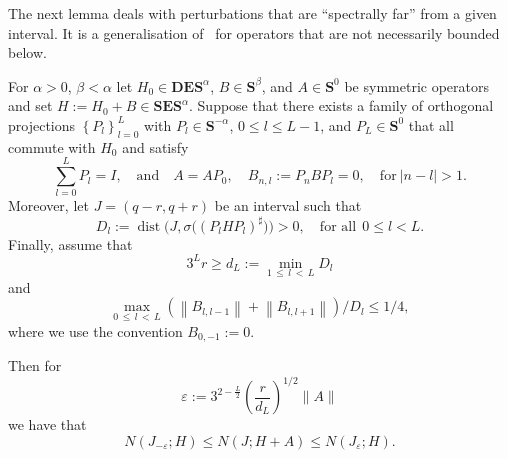 \documentclass[AHL,Unicode,longabstracts,published]{cedram}
\newcommand{\BD}{\mathbf D}
\newcommand{\BE}{\mathbf E}
\newcommand{\BS}{\mathbf S}
\newcommand{\eps}{\varepsilon}
\newcommand{\abs}[1]{\left\lvert #1 \right\rvert}
\newcommand{\set}[1]{\left\{ #1 \right\}}
\newcommand{\norm}[1]{\left\| #1 \right\|}
\begin{document}
The next lemma deals with perturbations that are ``spectrally far'' from a given interval. It is a generalisation of~\cite[Lemma~11.1]{MorParSht2014} for operators that are not necessarily bounded below.


\begin{lemm} \label{lem:spectralperturb}
For $\alpha>0$, $\beta < \alpha$ let $H_0 \in \BD\BE\BS^\alpha$, $B \in \BS^\beta$, and $A\in\BS^0$ be symmetric operators and set $H:=H_0+B\in\BS\BE\BS^\alpha$. Suppose that there exists a family of orthogonal projections $\set{P_l}_{l=0}^L$ with $P_l\in \BS^{-\alpha}$, $0\leq l\leq L-1$, and $P_L\in \BS^0$ that all commute with $H_0$ and satisfy
\begin{equation}\label{eq:projections}
\sum_{l=0}^L P_l = I, \quad \text{and} \quad A = A P_0, \quad B_{n,l} := P_n B P_l = 0, \quad \text{for} \ \abs{n-l}>1.
\end{equation}
Moreover, let $J = (q-r,q+r)$ be an interval such that
\begin{equation}\label{eq:distspectrum}
D_l:=\operatorname{dist}\big(J,\sigma\big((P_l H P_l)^\sharp\big)\big)>0,\quad \text{for all}\ \ 0\leq l<L.
\end{equation}
Finally, assume that
\begin{equation}\label{eq:tecassL}
3^Lr\geq d_L:=\min\limits_{1\,\leq\,l\,<\,L} D_l
\end{equation}
and
\begin{equation}\label{eq:projectionnorm}
\max_{0\,\le\,l\,<\,L} (\norm{B_{l,l-1}} + \norm{B_{l,l+1}})/D_l \le 1/4,
\end{equation}
where we use the convention $B_{0,-1}:=0$.

Then for
\begin{equation}\label{eq:epschoice}
\eps := 3^{2 - \frac{L}{2}} \left(\frac{r}{d_L}\right)^{1/2} \|A\|
\end{equation}
we have that
\begin{equation}
N(J_{-\eps};H) \le N(J;H + A) \le N\left(J_{\eps};H\right).\label{eq:approximationcontrol}
\end{equation}
\end{lemm}
\end{document}
